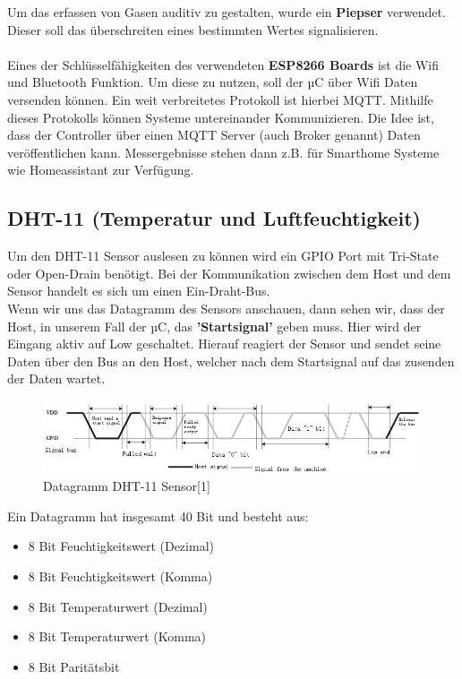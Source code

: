 \documentclass[a4paper, 11pt]{article}
\begin{document}
Um das erfassen von Gasen auditiv zu gestalten, wurde ein \textbf{Piepser}
verwendet. Dieser soll das überschreiten eines bestimmten Wertes signalisieren.
\\\\
Eines der Schlüsselfähigkeiten des verwendeten \textbf{ESP8266 Boards} ist die 
Wifi und Bluetooth Funktion. Um diese zu nutzen, soll der µC über Wifi Daten
versenden können. Ein weit verbreitetes Protokoll ist hierbei MQTT. Mithilfe
dieses Protokolls können Systeme untereinander Kommunizieren. Die Idee ist,
dass der Controller über einen MQTT Server (auch Broker genannt) Daten
veröffentlichen kann. Messergebnisse stehen dann z.B. für Smarthome Systeme wie
Homeassistant zur Verfügung.

\subsection{DHT-11 (Temperatur und Luftfeuchtigkeit)}

Um den DHT-11 Sensor auslesen zu können wird ein GPIO Port mit Tri-State 
oder Open-Drain benötigt. Bei der Kommunikation zwischen dem Host und dem Sensor
handelt es sich um einen Ein-Draht-Bus.\\

Wenn wir uns das Datagramm des Sensors anschauen, dann sehen wir, dass der Host,
in unserem Fall der µC, das \textbf{'Startsignal'} geben muss. Hier wird der Eingang
aktiv auf Low geschaltet. Hierauf reagiert der Sensor und sendet seine Daten
über den Bus an den Host, welcher nach dem Startsignal auf das zusenden der Daten
wartet.\\

\begin{figure}[h]
    \begin{center}
        \includegraphics[width=12cm]{dht11_datagramm.png}
    \caption{Datagramm DHT-11 Sensor[1]}
    \end{center}
\end{figure}

\newpage
Ein Datagramm hat insgesamt 40 Bit und besteht aus:
\begin{itemize}
    \item 8 Bit Feuchtigkeitswert (Dezimal)
    \item 8 Bit Feuchtigkeitswert (Komma)
    \item 8 Bit Temperaturwert (Dezimal)
    \item 8 Bit Temperaturwert (Komma)
    \item 8 Bit Paritätsbit
\end{itemize}
\end{document}
